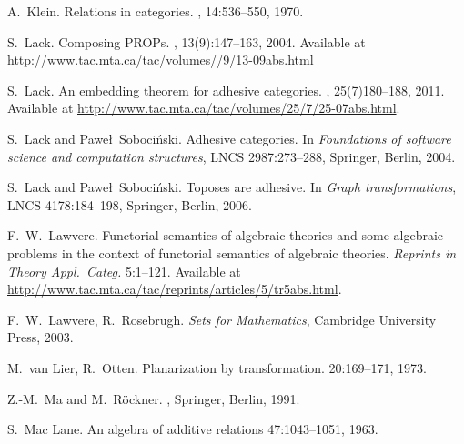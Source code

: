 \begin{thebibliography}{RSW00}
    A.\ Klein. 
    \newblock Relations in categories. 
    , 14:536--550, 1970.

    S.\ Lack.
    \newblock Composing PROPs.
    , { 13}(9):147--163,
    2004.
    \newblock Available at
    \href{http://www.tac.mta.ca/tac/volumes/13/9/13-09abs.html}{http://www.tac.mta.ca/tac/volumes//9/13-09abs.html}

    S.\ Lack.
    \newblock An embedding theorem for adhesive categories.
    , 25(7)180--188, 2011.
    \newblock Available at
    \href{http://www.tac.mta.ca/tac/volumes/25/7/25-07abs.html}{http://www.tac.mta.ca/tac/volumes/25/7/25-07abs.html}.

    S.\ Lack and Pawe\l\ Soboci\'nski. 
    \newblock Adhesive categories. 
    \newblock In {\em Foundations of software science and computation
    structures}, LNCS 2987:273--288, Springer, Berlin, 2004.
    
    S.\ Lack and Pawe\l\ Soboci\'nski. 
    \newblock Toposes are adhesive. 
    \newblock In {\em Graph transformations}, LNCS 4178:184--198,
    Springer, Berlin, 2006.

    F.\ W.\ Lawvere.
    \newblock Functorial semantics of algebraic theories and
    some algebraic problems in the context of functorial semantics of algebraic
    theories.
    \newblock \textsl{Reprints in Theory Appl.\ Categ.} { 5}:1--121.
    \newblock 
    Available at
    \href{http://www.tac.mta.ca/tac/reprints/articles/5/tr5abs.html}
    {http://www.tac.mta.ca/tac/reprints/articles/5/tr5abs.html}.

    F.\ W.\ Lawvere, R.\ Rosebrugh.
    \newblock \emph{Sets for Mathematics},
    Cambridge University Press, 2003.

    M.\ van Lier, R.\ Otten.
    \newblock Planarization by transformation.
     { 20}:169--171, 1973.

    Z.-M.\ Ma and M.\ R\"ockner.
    , Springer, Berlin, 1991.
    
    S.\ Mac Lane.
    \newblock An algebra of additive relations
     { 47}:1043--1051, 1963. 


\end{thebibliography}
